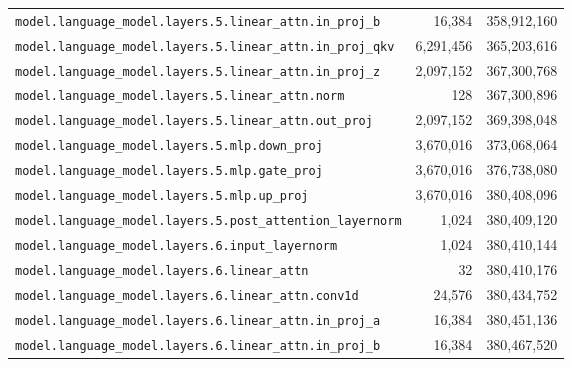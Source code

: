 \documentclass[10pt,a4paper]{article}
\theoremstyle{definition}
\begin{document}
\begin{appendices}
\begin{longtable}{p{9.5cm}rr}
\texttt{model.\allowbreak{}language\_model.\allowbreak{}layers.\allowbreak{}5.\allowbreak{}linear\_attn.\allowbreak{}in\_proj\_b} & 16,384 & 358,912,160 \\
\texttt{model.\allowbreak{}language\_model.\allowbreak{}layers.\allowbreak{}5.\allowbreak{}linear\_attn.\allowbreak{}in\_proj\_qkv} & 6,291,456 & 365,203,616 \\
\texttt{model.\allowbreak{}language\_model.\allowbreak{}layers.\allowbreak{}5.\allowbreak{}linear\_attn.\allowbreak{}in\_proj\_z} & 2,097,152 & 367,300,768 \\
\texttt{model.\allowbreak{}language\_model.\allowbreak{}layers.\allowbreak{}5.\allowbreak{}linear\_attn.\allowbreak{}norm} & 128 & 367,300,896 \\
\texttt{model.\allowbreak{}language\_model.\allowbreak{}layers.\allowbreak{}5.\allowbreak{}linear\_attn.\allowbreak{}out\_proj} & 2,097,152 & 369,398,048 \\
\texttt{model.\allowbreak{}language\_model.\allowbreak{}layers.\allowbreak{}5.\allowbreak{}mlp.\allowbreak{}down\_proj} & 3,670,016 & 373,068,064 \\
\texttt{model.\allowbreak{}language\_model.\allowbreak{}layers.\allowbreak{}5.\allowbreak{}mlp.\allowbreak{}gate\_proj} & 3,670,016 & 376,738,080 \\
\texttt{model.\allowbreak{}language\_model.\allowbreak{}layers.\allowbreak{}5.\allowbreak{}mlp.\allowbreak{}up\_proj} & 3,670,016 & 380,408,096 \\
\texttt{model.\allowbreak{}language\_model.\allowbreak{}layers.\allowbreak{}5.\allowbreak{}post\_attention\_layernorm} & 1,024 & 380,409,120 \\
\texttt{model.\allowbreak{}language\_model.\allowbreak{}layers.\allowbreak{}6.\allowbreak{}input\_layernorm} & 1,024 & 380,410,144 \\
\texttt{model.\allowbreak{}language\_model.\allowbreak{}layers.\allowbreak{}6.\allowbreak{}linear\_attn} & 32 & 380,410,176 \\
\texttt{model.\allowbreak{}language\_model.\allowbreak{}layers.\allowbreak{}6.\allowbreak{}linear\_attn.\allowbreak{}conv1d} & 24,576 & 380,434,752 \\
\texttt{model.\allowbreak{}language\_model.\allowbreak{}layers.\allowbreak{}6.\allowbreak{}linear\_attn.\allowbreak{}in\_proj\_a} & 16,384 & 380,451,136 \\
\texttt{model.\allowbreak{}language\_model.\allowbreak{}layers.\allowbreak{}6.\allowbreak{}linear\_attn.\allowbreak{}in\_proj\_b} & 16,384 & 380,467,520 \\

\end{longtable}
\end{appendices}
\end{document}

